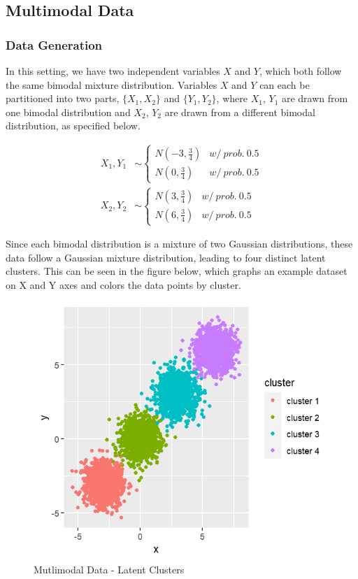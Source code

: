 \documentclass[
]{article}
\begin{document}
\hypertarget{multimodal-data}{%
\subsection{Multimodal Data}\label{multimodal-data}}

\hypertarget{data-generation-1}{%
\subsubsection{Data Generation}\label{data-generation-1}}

In this setting, we have two independent variables \(X\) and \(Y\),
which both follow the same bimodal mixture distribution. Variables \(X\)
and \(Y\) can each be partitioned into two parts, \(\{X_1, X_2\}\) and
\(\{Y_1, Y_2\}\), where \(X_1\), \(Y_1\) are drawn from one bimodal
distribution and \(X_2\), \(Y_2\) are drawn from a different bimodal
distribution, as specified below.

\begin{align*}
  X_1, Y_1 & \sim 
  \begin{cases}
    N(-3, \frac{3}{4}) & w/\ prob.\ 0.5 \\
    N(0, \frac{3}{4}) & w/\ prob.\ 0.5
  \end{cases} \\
  X_2, Y_2 & \sim
  \begin{cases}
    N(3, \frac{3}{4}) & w/\ prob.\ 0.5 \\
    N(6, \frac{3}{4}) & w/\ prob.\ 0.5
  \end{cases}
\end{align*}

Since each bimodal distribution is a mixture of two Gaussian
distributions, these data follow a Gaussian mixture distribution,
leading to four distinct latent clusters. This can be seen in the figure
below, which graphs an example dataset on X and Y axes and colors the
data points by cluster.

\begin{figure}
\centering
\includegraphics{report_image/multimodal_clusters.png}
\caption{Mutlimodal Data - Latent Clusters}
\end{figure}
\end{document}
